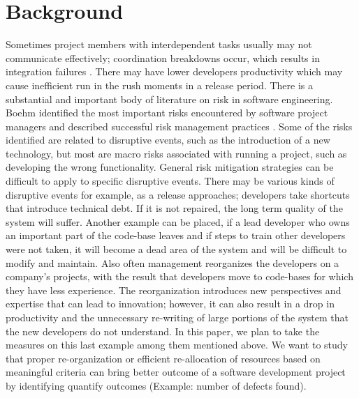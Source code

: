 \documentclass{acm_proc_article-sp}
\begin{document}
\section{Background}
Sometimes project members with interdependent tasks usually may not communicate effectively; coordination breakdowns occur, which results in integration failures \cite{3_kwan}. There may have lower developers productivity \cite{4_cataldo, 5_damian} which may cause inefficient run in the rush moments in a release period. There is a substantial and important body of literature on risk in software engineering. Boehm identified the most important risks encountered by software project managers and described successful risk management practices \cite{6_boehm, 7_keil, 8_boehm}. Some of the risks identified are related to disruptive events, such as the introduction of a new technology, but most are macro risks associated with running a project, such as developing the wrong functionality. General risk mitigation strategies can be difficult to apply to specific disruptive events. There may be various kinds of disruptive events for example, as a release approaches; developers take shortcuts that introduce technical debt. If it is not repaired, the long term quality of the system will suffer. Another example can be placed, if a lead developer who owns an important part of the code-base leaves and if steps to train other developers were not taken, it will become a dead area of the system and will be difficult to modify and maintain. Also often management reorganizes the developers on a company’s projects, with the result that developers move to code-bases for which they have less experience. The reorganization introduces new perspectives and expertise that can lead to innovation; however, it can also result in a drop in productivity and the unnecessary re-writing of large portions of the system that the new developers do not understand.
In this paper, we plan to take the measures on this last example among them mentioned above. We want to study that proper re-organization or efficient re-allocation of resources based on meaningful criteria can bring better outcome of a software development project by identifying quantify outcomes (Example: number of defects found).
\end{document}
